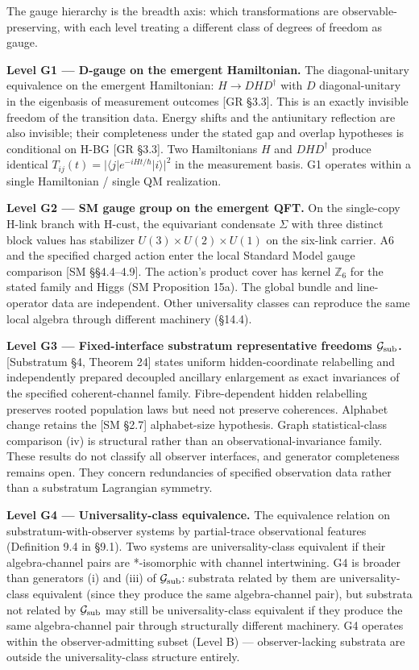 \documentclass[
]{article}
\begin{document}
The gauge hierarchy is the breadth axis: which transformations are
observable-preserving, with each level treating a different class of
degrees of freedom as gauge.

\textbf{Level G1 --- D-gauge on the emergent Hamiltonian.} The
diagonal-unitary equivalence on the emergent Hamiltonian:
\(H \to D H D^\dagger\) with \(D\) diagonal-unitary in the eigenbasis of
measurement outcomes {[}GR §3.3{]}. This is an exactly invisible freedom
of the transition data. Energy shifts and the antiunitary reflection are
also invisible; their completeness under the stated gap and overlap
hypotheses is conditional on H-BG {[}GR §3.3{]}. Two Hamiltonians \(H\)
and \(DHD^\dagger\) produce identical
\(T_{ij}(t) = |\langle j|e^{-iHt/\hbar}|i\rangle|^2\) in the measurement
basis. G1 operates within a single Hamiltonian / single QM realization.

\textbf{Level G2 --- SM gauge group on the emergent QFT.} On the
single-copy H-link branch with H-cust, the equivariant condensate
\(\Sigma\) with three distinct block values has stabilizer
\(U(3)\times U(2)\times U(1)\) on the six-link carrier. A6 and the
specified charged action enter the local Standard Model gauge comparison
{[}SM §§4.4--4.9{]}. The action's product cover has kernel
\(\mathbb Z_6\) for the stated family and Higgs (SM Proposition 15a).
The global bundle and line-operator data are independent. Other
universality classes can reproduce the same local algebra through
different machinery (§14.4).

\textbf{Level G3 --- Fixed-interface substratum representative freedoms
\(\mathcal G_{\rm sub}\).} {[}Substratum §4, Theorem 24{]} states
uniform hidden-coordinate relabelling and independently prepared
decoupled ancillary enlargement as exact invariances of the specified
coherent-channel family. Fibre-dependent hidden relabelling preserves
rooted population laws but need not preserve coherences. Alphabet change
retains the {[}SM §2.7{]} alphabet-size hypothesis. Graph
statistical-class comparison (iv) is structural rather than an
observational-invariance family. These results do not classify all
observer interfaces, and generator completeness remains open. They
concern redundancies of specified observation data rather than a
substratum Lagrangian symmetry.

\textbf{Level G4 --- Universality-class equivalence.} The equivalence
relation on substratum-with-observer systems by partial-trace
observational features (Definition 9.4 in §9.1). Two systems are
universality-class equivalent if their algebra-channel pairs are
*-isomorphic with channel intertwining. G4 is broader than generators
(i) and (iii) of \(\mathcal{G}_{\rm sub}\): substrata related by them
are universality-class equivalent (since they produce the same
algebra-channel pair), but substrata not related by
\(\mathcal{G}_{\rm sub}\) may still be universality-class equivalent if
they produce the same algebra-channel pair through structurally
different machinery. G4 operates within the observer-admitting subset
(Level B) --- observer-lacking substrata are outside the
universality-class structure entirely.
\end{document}
